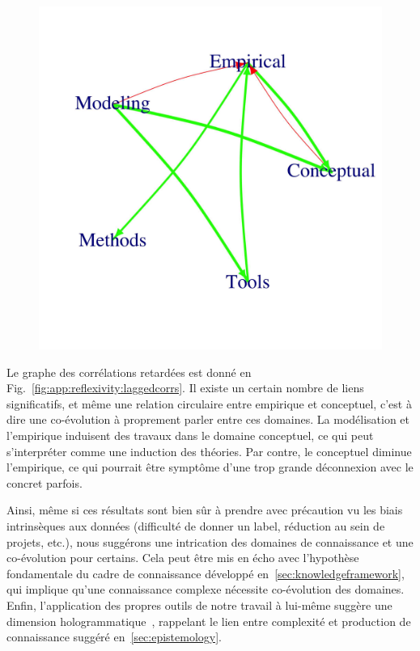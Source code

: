 \begin{figure}
	\includegraphics[width=\linewidth]{Figures/Final/F-reflexivity-laggedcorrs.jpg}
\end{figure}


Le graphe des corrélations retardées est donné en Fig.~\ref{fig:app:reflexivity:laggedcorrs}. Il existe un certain nombre de liens significatifs, et même une relation circulaire entre empirique et conceptuel, c'est à dire une co-évolution à proprement parler entre ces domaines. La modélisation et l'empirique induisent des travaux dans le domaine conceptuel, ce qui peut s'interpréter comme une induction des théories. Par contre, le conceptuel diminue l'empirique, ce qui pourrait être symptôme d'une trop grande déconnexion avec le concret parfois.

Ainsi, même si ces résultats sont bien sûr à prendre avec précaution vu les biais intrinsèques aux données (difficulté de donner un label, réduction au sein de projets, etc.), nous suggérons une intrication des domaines de connaissance et une co-évolution pour certains. Cela peut être mis en écho avec l'hypothèse fondamentale du cadre de connaissance développé en~\ref{sec:knowledgeframework}, qui implique qu'une connaissance complexe nécessite co-évolution des domaines. Enfin, l'application des propres outils de notre travail à lui-même suggère une dimension hologrammatique~\cite{morin1986methode}, rappelant le lien entre complexité et production de connaissance suggéré en~\ref{sec:epistemology}. 



